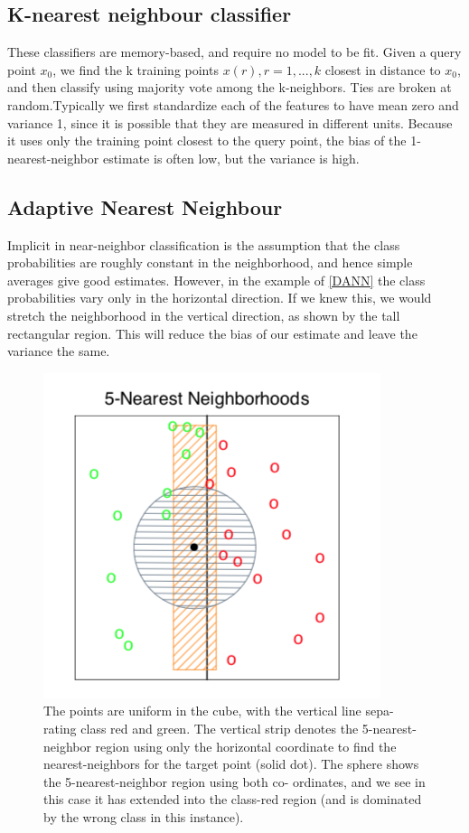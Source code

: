 \documentclass[12pt, letterpaper]{article}
\theoremstyle{definition}
\begin{document}
\subsection{K-nearest neighbour classifier}
These classifiers are memory-based, and require no model to be fit. Given a query point $x_0$, we find the k training points $x(r),r = 1,...,k$ closest in distance to $x_0$, and then classify using majority vote among the k-neighbors. Ties are broken at random.Typically we first standardize each of the features to have mean zero and variance 1, since it is possible that they are measured in different units. Because it uses only the training point closest to the query point, the bias of the 1-nearest-neighbor estimate is often low, but the variance is high.

\subsection{Adaptive Nearest Neighbour}
Implicit in near-neighbor classification is the assumption that the class probabilities are roughly constant in the neighborhood, and hence simple averages give good estimates.
However, in the example of \autoref{DANN} the class probabilities vary only in the horizontal direction. If we knew this, we would stretch the neighborhood in the vertical direction, as shown by the tall rectangular region. This will reduce the bias of our estimate and leave the variance the same.

\begin{figure}
\centering
\includegraphics[scale=0.7]{img/DANN}
\caption{The points are uniform in the cube, with the vertical line sepa- rating class red and green. The vertical strip denotes the 5-nearest-neighbor region using only the horizontal coordinate to find the nearest-neighbors for the target point (solid dot). The sphere shows the 5-nearest-neighbor region using both co- ordinates, and we see in this case it has extended into the class-red region (and is dominated by the wrong class in this instance).}
\label{DANN}
\end{figure}
\end{document}
